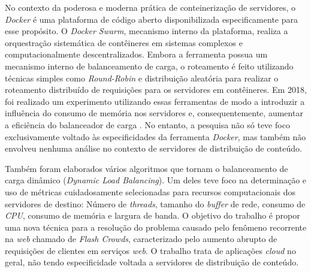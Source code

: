 No contexto da poderosa e moderna prática de conteinerização de servidores, o \textit{Docker} é uma plataforma de código aberto disponibilizada especificamente para esse propósito. O \textit{Docker Swarm}, mecanismo interno da plataforma, realiza a orquestração sistemática de contêineres em sistemas complexos e computacionalmente descentralizados. Embora a ferramenta possua um mecanismo interno de balanceamento de carga, o roteamento é feito utilizando técnicas simples como \textit{Round-Robin} e distribuição aleatória para realizar o roteamento distribuído de requisições para os servidores em contêineres. Em 2018, foi realizado um experimento utilizando essas ferramentas de modo a introduzir a influência do consumo de memória nos servidores e, consequentemente, aumentar a eficiência do balanceador de carga \cite{dockerswarmmemory2018}. No entanto, a pesquisa não só teve foco exclusivamente voltado às especificidades da ferramenta \textit{Docker}, mas também não envolveu nenhuma análise no contexto de servidores de distribuição de conteúdo.

Também foram elaborados vários algoritmos que tornam o balanceamento de carga dinâmico (\textit{Dynamic Load Balancing}). Um deles \cite{novelWeightAssignmentLoadBalancingAlgorithmForCloudApps2023} teve foco na determinação e uso de métricas cuidadosamente selecionadas para recursos computacionais dos servidores de destino: Número de \textit{threads}, tamanho do \textit{buffer} de rede, consumo de \textit{CPU}, consumo de memória e largura de banda. O objetivo do trabalho é propor uma nova técnica para a resolução do problema causado pelo fenômeno recorrente na \textit{web} chamado de \textit{Flash Crowds}, caracterizado pelo aumento abrupto de requisições de clientes em serviços \textit{web}. O trabalho trata de aplicações \textit{cloud} no geral, não tendo especificidade voltada a servidores de distribuição de conteúdo.

